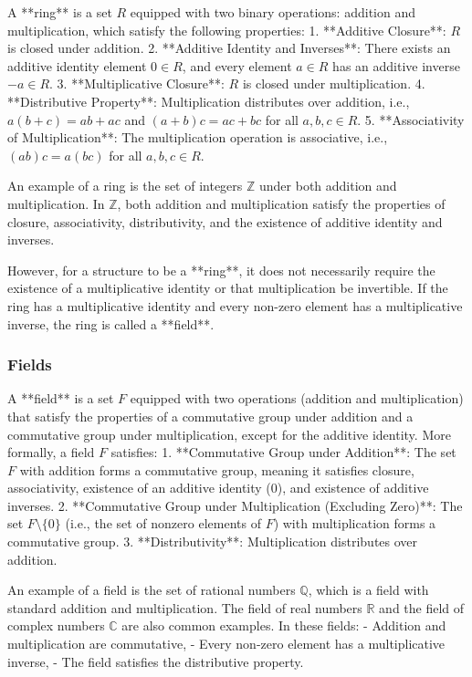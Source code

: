 \documentclass{article}
\begin{document}
A **ring** is a set \( R \) equipped with two binary operations: addition and multiplication, which satisfy the following properties:
1. **Additive Closure**: \( R \) is closed under addition.
2. **Additive Identity and Inverses**: There exists an additive identity element \( 0 \in R \), and every element \( a \in R \) has an additive inverse \( -a \in R \).
3. **Multiplicative Closure**: \( R \) is closed under multiplication.
4. **Distributive Property**: Multiplication distributes over addition, i.e., \( a(b + c) = ab + ac \) and \( (a + b)c = ac + bc \) for all \( a, b, c \in R \).
5. **Associativity of Multiplication**: The multiplication operation is associative, i.e., \( (ab)c = a(bc) \) for all \( a, b, c \in R \).

An example of a ring is the set of integers \( \mathbb{Z} \) under both addition and multiplication. In \( \mathbb{Z} \), both addition and multiplication satisfy the properties of closure, associativity, distributivity, and the existence of additive identity and inverses.

However, for a structure to be a **ring**, it does not necessarily require the existence of a multiplicative identity or that multiplication be invertible. If the ring has a multiplicative identity and every non-zero element has a multiplicative inverse, the ring is called a **field**.

\subsubsection*{Fields}

A **field** is a set \( F \) equipped with two operations (addition and multiplication) that satisfy the properties of a commutative group under addition and a commutative group under multiplication, except for the additive identity. More formally, a field \( F \) satisfies:
1. **Commutative Group under Addition**: The set \( F \) with addition forms a commutative group, meaning it satisfies closure, associativity, existence of an additive identity (0), and existence of additive inverses.
2. **Commutative Group under Multiplication (Excluding Zero)**: The set \( F \setminus \{0\} \) (i.e., the set of nonzero elements of \( F \)) with multiplication forms a commutative group.
3. **Distributivity**: Multiplication distributes over addition.

An example of a field is the set of rational numbers \( \mathbb{Q} \), which is a field with standard addition and multiplication. The field of real numbers \( \mathbb{R} \) and the field of complex numbers \( \mathbb{C} \) are also common examples. In these fields:
- Addition and multiplication are commutative,
- Every non-zero element has a multiplicative inverse,
- The field satisfies the distributive property.
\end{document}
